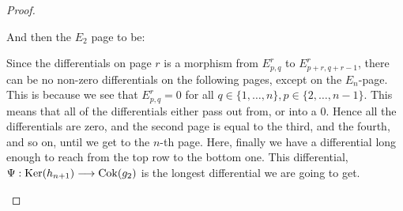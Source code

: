 \begin{proof}
\begin{center}
\begin{tikzcd}[column sep=1em]
\end{tikzcd}
\end{center}
And then the $E_2$ page to be:
\begin{center}
\end{center}
Since the differentials on page $r$ is a morphism from $E_{p,q}^r$ to $E_{p+r,q+r-1}^r$, there can be no non-zero differentials on the following pages, except on the $E_n$-page. This is because we see that $E_{p,q}^r=0$ for all $q\in \{1,\dots,n\}, p\in \{2,\dots, n-1\}$. This means that all of the differentials either pass out from, or into a 0. Hence all the differentials are zero, and the second page is equal to the third, and the fourth, and so on, until we get to the $n$-th page. Here, finally we have a differential long enough to reach from the top row to the bottom one. This differential, $\Psi : \Ker(h_{n+1})\longrightarrow \Cok(g_2)$ is the longest differential we are going to get. 
\begin{center}
\end{center}
\end{proof}
